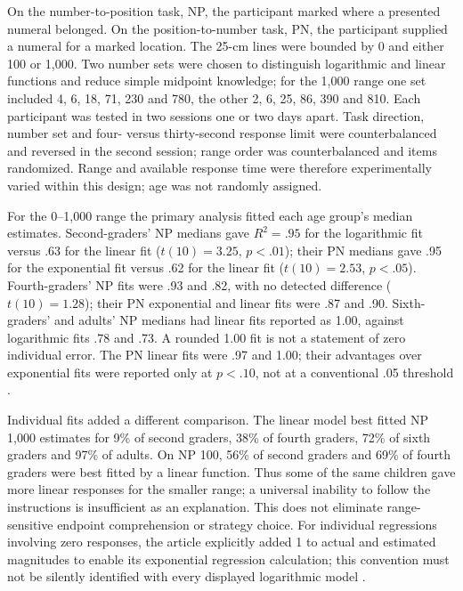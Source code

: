 On the number-to-position task, NP, the participant marked where a
presented numeral belonged. On the position-to-number task, PN, the
participant supplied a numeral for a marked location. The 25-cm lines
were bounded by 0 and either 100 or 1,000. Two number sets were chosen
to distinguish logarithmic and linear functions and reduce simple
midpoint knowledge; for the 1,000 range one set included 4, 6, 18, 71,
230 and 780, the other 2, 6, 25, 86, 390 and 810. Each participant
was tested in two sessions one or two days apart. Task direction,
number set and four- versus thirty-second response limit were
counterbalanced and reversed in the second session; range order was
counterbalanced and items randomized. Range and available response
time were therefore experimentally varied within this design; age was
not randomly assigned.

For the 0--1,000 range the primary analysis fitted each age group's
median estimates. Second-graders' NP medians gave \(R^2=.95\) for
the logarithmic fit versus .63 for the linear fit
(\(t(10)=3.25\), \(p<.01\)); their PN medians gave .95 for the
exponential fit versus .62 for the linear fit
(\(t(10)=2.53\), \(p<.05\)). Fourth-graders' NP fits were .93
and .82, with no detected difference (\(t(10)=1.28\)); their PN
exponential and linear fits were .87 and .90. Sixth-graders' and
adults' NP medians had linear fits reported as 1.00, against
logarithmic fits .78 and .73. A rounded 1.00 fit is not a statement
of zero individual error. The PN linear fits were .97 and 1.00;
their advantages over exponential fits were reported only at
\(p<.10\), not at a conventional .05 threshold
\cite[pp.~239--240]{SieglerOpfer2003EstimationNL}.

Individual fits added a different comparison. The linear model best
fitted NP 1,000 estimates for 9\% of second graders, 38\% of fourth
graders, 72\% of sixth graders and 97\% of adults. On NP 100,
56\% of second graders and 69\% of fourth graders were best fitted
by a linear function. Thus some of the same children gave more linear
responses for the smaller range; a universal inability to follow the
instructions is insufficient as an explanation. This does not eliminate
range-sensitive endpoint comprehension or strategy choice.
For individual regressions involving zero responses, the article
explicitly added 1 to actual and estimated magnitudes to enable its
exponential regression calculation; this convention must not be
silently identified with every displayed logarithmic model
\cite[pp.~240--241]{SieglerOpfer2003EstimationNL}.


